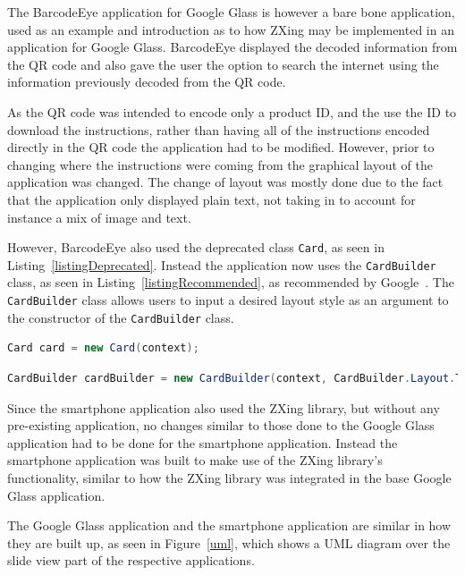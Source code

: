 The BarcodeEye application for Google Glass is however a bare bone application, used as an example and introduction as to how ZXing may be implemented in an application for Google Glass. BarcodeEye displayed the decoded information from the QR code and also gave the user the option to search the internet using the information previously decoded from the QR code.

As the QR code was intended to encode only a product ID, and the use the ID to download the instructions, rather than having all of the instructions encoded directly in the QR code the application had to be modified. However, prior to changing where the instructions were coming from the graphical layout of the application was changed. The change of layout was mostly done due to the fact that the application only displayed plain text, not taking in to account for instance a mix of image and text.

However, BarcodeEye also used the deprecated class \texttt{Card}, as seen in Listing~\ref{listingDeprecated}. Instead the application now uses the \texttt{CardBuilder} class, as seen in Listing~\ref{listingRecommended}, as recommended by Google~\cite{googleCard}. The \texttt{CardBuilder} class allows users to input a desired layout style as an argument to the constructor of the \texttt{CardBuilder} class.

\begin{lstlisting}[language=Java, caption={Instancing of the deprecated class Card}, label=listingDeprecated]
Card card = new Card(context);
\end{lstlisting}

\begin{lstlisting}[language=Java, caption={Instancing of the recommended class CardBuilder}, label=listingRecommended]
CardBuilder cardBuilder = new CardBuilder(context, CardBuilder.Layout.TITLE);
\end{lstlisting}

Since the smartphone application also used the ZXing library, but without any pre-existing application, no changes similar to those done to the Google Glass application had to be done for the smartphone application. Instead the smartphone application was built to make use of the ZXing library's functionality, similar to how the ZXing library was integrated in the base Google Glass application.

The Google Glass application and the smartphone application are similar in how they are built up, as seen in Figure~\ref{uml}, which shows a UML diagram over the slide view part of the respective applications.

